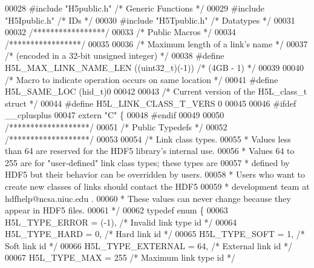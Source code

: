 \begin{DoxyCode}
00028 \textcolor{preprocessor}{#include "H5public.h"}       \textcolor{comment}{/* Generic Functions            */}
00029 \textcolor{preprocessor}{#include "H5Ipublic.h"}      \textcolor{comment}{/* IDs                  */}
00030 \textcolor{preprocessor}{#include "H5Tpublic.h"}      \textcolor{comment}{/* Datatypes                */}
00031 
00032 \textcolor{comment}{/*****************/}
00033 \textcolor{comment}{/* Public Macros */}
00034 \textcolor{comment}{/*****************/}
00035 
00036 \textcolor{comment}{/* Maximum length of a link's name */}
00037 \textcolor{comment}{/* (encoded in a 32-bit unsigned integer) */}
00038 \textcolor{preprocessor}{#define H5L\_MAX\_LINK\_NAME\_LEN   ((uint32\_t)(-1))  }\textcolor{comment}{/* (4GB - 1) */}\textcolor{preprocessor}{}
00039 
00040 \textcolor{comment}{/* Macro to indicate operation occurs on same location */}
00041 \textcolor{preprocessor}{#define H5L\_SAME\_LOC (hid\_t)0}
00042 
00043 \textcolor{comment}{/* Current version of the H5L\_class\_t struct */}
00044 \textcolor{preprocessor}{#define H5L\_LINK\_CLASS\_T\_VERS 0}
00045 
00046 \textcolor{preprocessor}{#ifdef \_\_cplusplus}
00047 \textcolor{keyword}{extern} \textcolor{stringliteral}{"C"} \{
00048 \textcolor{preprocessor}{#endif}
00049 
00050 \textcolor{comment}{/*******************/}
00051 \textcolor{comment}{/* Public Typedefs */}
00052 \textcolor{comment}{/*******************/}
00053 
00054 \textcolor{comment}{/* Link class types.}
00055 \textcolor{comment}{ * Values less than 64 are reserved for the HDF5 library's internal use.}
00056 \textcolor{comment}{ * Values 64 to 255 are for "user-defined" link class types; these types are}
00057 \textcolor{comment}{ * defined by HDF5 but their behavior can be overridden by users.}
00058 \textcolor{comment}{ * Users who want to create new classes of links should contact the HDF5}
00059 \textcolor{comment}{ * development team at hdfhelp@ncsa.uiuc.edu .}
00060 \textcolor{comment}{ * These values can never change because they appear in HDF5 files.}
00061 \textcolor{comment}{ */}
00062 \textcolor{keyword}{typedef} \textcolor{keyword}{enum} \{
00063     H5L\_TYPE\_ERROR = (-1),      \textcolor{comment}{/* Invalid link type id         */}
00064     H5L\_TYPE\_HARD = 0,          \textcolor{comment}{/* Hard link id                 */}
00065     H5L\_TYPE\_SOFT = 1,          \textcolor{comment}{/* Soft link id                 */}
00066     H5L\_TYPE\_EXTERNAL = 64,     \textcolor{comment}{/* External link id             */}
00067     H5L\_TYPE\_MAX = 255          \textcolor{comment}{/* Maximum link type id         */}

\end{DoxyCode}
